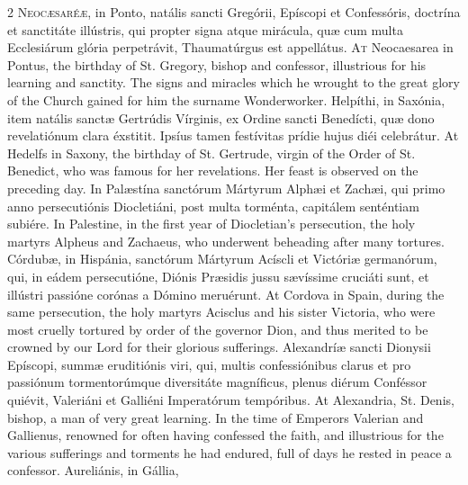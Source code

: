 \begin{paracol}{2}
\lettrine[lines=2]{N}{eocæsaréæ,} in Ponto, 
 natális sancti Gregórii, Epíscopi et Confessóris, doctrína et sanctitáte 
 illústris, qui propter signa atque mirácula, quæ cum multa Ecclesiárum 
 glória perpetrávit, Thaumatúrgus est appellátus.
\switchcolumn
{}
\lettrine[lines=2]{A}{t} Neocaesarea in Pontus, the 
 birthday of St. Gregory, bishop and confessor, illustrious for his learning 
 and sanctity. The signs and miracles which he wrought to the great 
 glory of the Church gained for him the surname Wonderworker.
\switchcolumn*
{}
Helpíthi, in Saxónia, 
 item natális sanctæ Gertrúdis Vírginis, ex Ordine sancti Benedícti, quæ dono 
 revelatiónum clara éxstitit. Ipsíus tamen festívitas prídie hujus diéi 
 celebrátur.
\switchcolumn
{}
At Hedelfs in Saxony, the birthday 
 of St. Gertrude, virgin of the Order of St. Benedict, who was famous for her 
 revelations. Her feast is observed on the preceding day.
\switchcolumn*
{}
In Palæstína sanctórum 
 Mártyrum Alphæi et Zachæi, qui primo anno persecutiónis Diocletiáni, post 
 multa torménta, capitálem senténtiam subiére.
\switchcolumn
{}
In Palestine, in the first year of 
 Diocletian's persecution, the holy martyrs Alpheus and Zachaeus, who 
 underwent beheading after many tortures.
\switchcolumn*
{}
Córdubæ, in Hispánia, 
 sanctórum Mártyrum Acíscli et Victóriæ germanórum, qui, in eádem 
 persecutióne, Diónis Præsidis jussu sævíssime cruciáti sunt, et illústri 
 passióne corónas a Dómino meruérunt.
\switchcolumn
{}
At Cordova in Spain, during the same 
 persecution, the holy martyrs Acisclus and his sister Victoria, who were 
 most cruelly tortured by order of the governor Dion, and thus merited to be 
 crowned by our Lord for their glorious sufferings.
\switchcolumn*
{}
Alexandríæ sancti 
 Dionysii Epíscopi, summæ eruditiónis viri, qui, multis confessiónibus clarus 
 et pro passiónum tormentorúmque diversitáte magníficus, plenus diérum 
 Conféssor quiévit, Valeriáni et Galliéni Imperatórum tempóribus.
\switchcolumn
{}
At Alexandria, St. Denis, bishop, a 
 man of very great learning. In the time of Emperors Valerian and 
 Gallienus, renowned for often having confessed the faith, and illustrious 
 for the various sufferings and torments he had endured, full of days he 
 rested in peace a confessor.
\switchcolumn*
{}
Aureliánis, in Gállia, 

\end{paracol}
